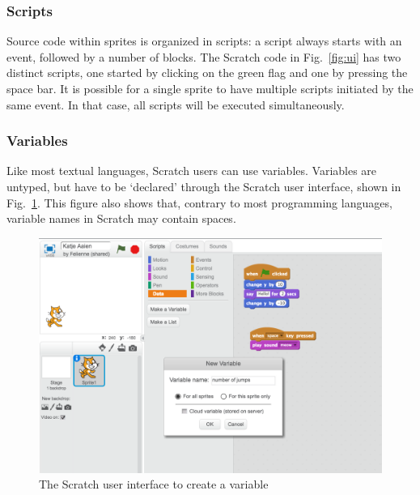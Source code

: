 \documentclass[conference]{IEEEtran}
\begin{document}

\subsubsection{Scripts}
Source code within sprites is organized in scripts: a script always starts with an event, followed by a number of blocks. The Scratch code in Fig.~\ref{fig:ui} has two distinct scripts, one started by clicking on the green flag and one by pressing the space bar. It is possible for a single sprite to have multiple scripts initiated by the same event. In that case, all scripts will be executed simultaneously. 



\subsubsection{Variables}
Like most textual languages, Scratch users can use variables. Variables are untyped, but have to be `declared' through the Scratch user interface, shown in Fig.~\ref{fig:ui-vars}. This figure also shows that, contrary to most programming languages, variable names in Scratch may contain spaces.

\begin{figure}
  \begin{center}
  \includegraphics[width=\columnwidth]{fig/ui-vars.png}
  \caption{The Scratch user interface to create a variable}
  \label{fig:ui-vars}
  \end{center}
\end{figure} 
\end{document}
